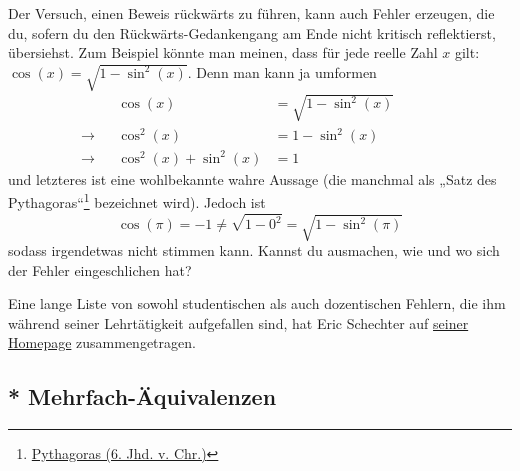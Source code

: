 \begin{bem}
    Der Versuch, einen Beweis rückwärts zu führen, kann auch Fehler erzeugen, die du, sofern du den Rückwärts-Gedankengang am Ende nicht kritisch reflektierst, übersiehst. Zum Beispiel könnte man meinen, dass für jede reelle Zahl $x$ gilt: $\cos(x)=\sqrt{1-\sin^2(x)}$. Denn man kann ja umformen
    \begin{align*}
        && \cos(x) & =\sqrt{1-\sin^2(x)} &&&& \\
        \to && \cos^2(x) & = 1-\sin^2(x) &&&& \\
        \to && \cos^2(x) + \sin^2(x) & = 1 &&&&
    \end{align*}
    und letzteres ist eine wohlbekannte wahre Aussage (die manchmal als „Satz des Pythagoras“\footnote{\href{https://de.wikipedia.org/wiki/Pythagoras}{Pythagoras (6. Jhd. v. Chr.)}} bezeichnet wird). Jedoch ist
        \[ \cos(\pi) = -1 \neq \sqrt{1-0^2} = \sqrt{1-\sin^2(\pi)} \]
    sodass irgendetwas nicht stimmen kann. Kannst du ausmachen, wie und wo sich der Fehler eingeschlichen hat?
\end{bem}


\begin{bem}
 Eine lange Liste von sowohl studentischen als auch dozentischen Fehlern, die ihm während seiner Lehrtätigkeit aufgefallen sind, hat Eric Schechter auf \href{https://math.vanderbilt.edu/schectex/commerrs/}{seiner Homepage} zusammengetragen.
\end{bem}





\subsection*{* Mehrfach-Äquivalenzen}


